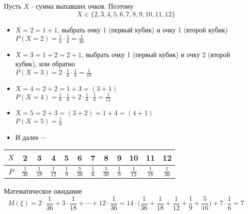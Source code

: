 \begin{exercise}[5]
	Пусть $X$ - сумма выпавших очков. Поэтому $$X \in \{2, 3, 4, 5, 6, 7, 8, 9, 10, 11, 12\}$$
	\begin{itemize}
		\item $X=2=1+1$, выбрать очку 1 (первый кубик) и очку 1 (второй кубик) \\ $P(X=2) = \frac{1}{6} \cdot \frac{1}{6} = \frac{1}{36}$
		\item $X=3=1+2=2+1$, выбрать очку 1 (первый кубик) и очку 2 (второй кубик), или обратно \\ $P(X=3) = 2 \cdot \frac{1}{6} \cdot \frac{1}{6} = \frac{1}{18}$
		\item $X=4=2+2=1+3=(3+1)$ \\ $P(X=4) = \frac{1}{6} \cdot \frac{1}{6} + 2 \cdot \frac{1}{6} \cdot \frac{1}{6} = \frac{1}{12}$
		\item $X=5=2+3=(3+2)=1+4=(4+1)$ \\ $P(X=5) = \frac{1}{9}$
		\item И далее $\cdots$
	\end{itemize}
	\begin{center}
		\begin{tabular}{|c|c|c|c|c|c|c|c|c|c|c|c|}
			\hline
			$X$ & 2 & 3 & 4 & 5 & 6 & 7 & 8 & 9 & 10 & 11 & 12 \\ \hline
			$P$ & $\frac{1}{36}$ & $\frac{1}{18}$ & $\frac{1}{12}$ & $\frac{1}{9}$ & $\frac{5}{36}$ & $\frac{1}{6}$ & $\frac{5}{36}$ & $\frac{1}{9}$ & $\frac{1}{12}$ & $\frac{1}{18}$ & $\frac{1}{36}$ \\ \hline
		\end{tabular}
	\end{center}
	Математическое ожидание
	$$M(\xi) = 2 \cdot \frac{1}{36} + 3 \cdot \frac{1}{18} + \cdots + 12 \cdot \frac{1}{36} = 14 \cdot \Big(\frac{1}{36} + \frac{1}{18} + \frac{1}{12} + \frac{1}{9} + \frac{5}{16}\Big) + 7 \cdot \frac{1}{6} = 7$$
\end{exercise}

